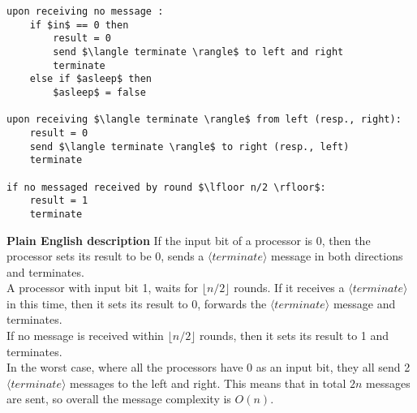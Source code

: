 \documentclass[11pt]{article}
\begin{document}
\begin{lstlisting}
upon receiving no message :
	if $in$ == 0 then
		result = 0
		send $\langle terminate \rangle$ to left and right
		terminate
	else if $asleep$ then
		$asleep$ = false

upon receiving $\langle terminate \rangle$ from left (resp., right):
	result = 0
	send $\langle terminate \rangle$ to right (resp., left)
	terminate
	
if no messaged received by round $\lfloor n/2 \rfloor$:
	result = 1
	terminate

\end{lstlisting}

\textbf{Plain English description}
If the input bit of a processor is 0, then the processor sets its result to be 0, sends a $\langle terminate \rangle$ message in both directions and terminates.\\
A processor with input bit 1, waits for  $\lfloor n/2 \rfloor$ rounds. If it receives a $\langle terminate \rangle$ in this time, then it sets its result to 0, forwards the $\langle terminate \rangle$ message and terminates.\\
If no message is received within $\lfloor n/2 \rfloor$ rounds, then it sets its result to 1 and terminates.\\

In the worst case, where all the processors have 0 as an input bit, they all send 2 $\langle terminate \rangle$ messages to the left and right. This means that in total $2n$ messages are sent, so overall the message complexity is $O(n)$.
\end{document}
